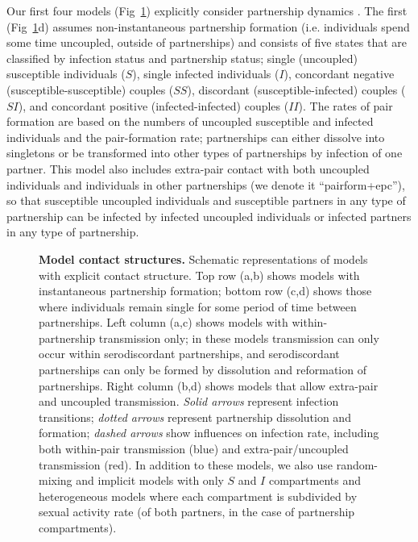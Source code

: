 \documentclass[10pt,letterpaper]{article}
\renewcommand{\figurename}{Fig}
\newcommand{\diagfig}[1]{\figurename~\ref{fig:diagrams}#1}
\begin{document}
Our first four models (\figurename~\ref{fig:diagrams}) explicitly consider partnership dynamics \cite{champredon_hiv_2013}. The first (\diagfig{d}) assumes non-instantaneous partnership formation (i.e. individuals spend some time uncoupled, outside of partnerships) and consists of five states that are classified by infection status and partnership status; single (uncoupled) susceptible individuals ($S$), single infected individuals ($I$), concordant negative (susceptible-susceptible) couples ($SS$), discordant (susceptible-infected) couples ($SI$), and concordant positive (infected-infected) couples ($II$). 
The rates of pair formation are based on the numbers of uncoupled susceptible and infected individuals and the pair-formation rate; partnerships can either dissolve into singletons or be transformed into other types of partnerships by infection of one partner. This model also includes extra-pair contact with both uncoupled individuals and individuals in other partnerships (we denote it ``pairform+epc''), so that susceptible uncoupled individuals and susceptible partners in any type of partnership can be infected by infected uncoupled individuals or infected partners in any type of partnership.

\begin{figure}[t!p]
\caption{\textbf{Model contact structures.} 
Schematic representations of models with
explicit contact structure. Top row (a,b) shows models with instantaneous
partnership formation; bottom row (c,d)  shows those where individuals remain
single for some period of time between partnerships. Left column (a,c) 
shows models with within-partnership transmission only; in these models
transmission can only occur within serodiscordant partnerships, and
serodiscordant partnerships can only be formed by dissolution
and reformation of partnerships. Right column (b,d) shows models
that allow extra-pair and uncoupled transmission.
\emph{Solid arrows} represent infection transitions; \emph{dotted arrows}
represent partnership dissolution and formation; \emph{dashed arrows}
show influences on infection rate, including both within-pair
transmission (blue) and extra-pair/uncoupled transmission (red).
In addition to these models, we also use random-mixing and implicit
models with only $S$ and $I$ compartments and heterogeneous models
where each compartment is subdivided by sexual activity rate
(of both partners, in the case of partnership compartments).
}
\label{fig:diagrams}
\end{figure}
\end{document}
